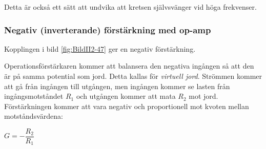 Detta är också ett sätt att undvika att kretsen självsvänger vid höga
frekvenser.

\subsubsection{Negativ (inverterande) förstärkning med op-amp}
\label{inverterande förstärkning}
\label{virtuell jord}
\label{jordning!virtuell}

Kopplingen i bild \ref{fig:BildII2-47} ger en negativ förstärkning.


Operationsförstärkaren kommer att balansera den negativa ingången så att den
är på samma potential som jord.
Detta kallas för \emph{virtuell jord}.
Strömmen kommer att gå från ingången till utgången, men ingången kommer se
lasten från ingångsmotståndet \(R_1\) och utgången kommer att mata \(R_2\) mot
jord.
Förstärkningen kommer att vara negativ och proportionell mot kvoten mellan
motståndsvärdena:

\(G = -\dfrac{R_2}{R_1}\)
